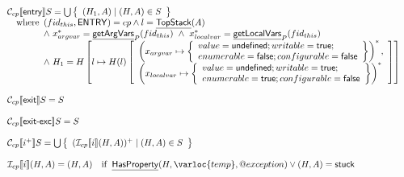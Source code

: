 \[
\begin{array}{l} 
\N _{cp}\lbr {\sf entry} \rbr S = 
 \bigcup\set{(H_1,A) \mid (H,A)\in S} \\
 \quad\wherec{
   ({fid_{this}},\SF{ENTRY}) = cp \land l=\chf{TopStack}(A)\\
   \land\ x_{argvar}^{*} = \chf{getArgVars}_P({fid_{this}})\ 
   \land\ x_{localvar}^{*} = \chf{getLocalVars}_P({fid_{this}}) \\
   \land\ H_1=H\left[l\mapsto
   H(l)
     \left[
       \begin{array}{l}
         \left(x_{argvar}\mapsto\set{value=\SF{undefined};writable=\vtrue;\\
             enumerable=\vfalse;configurable=\vfalse}\right)^{*}, \\
         \left(x_{localvar}\mapsto\set{value=\SF{undefined};writable=\vtrue;\\
             enumerable=\vtrue;configurable=\vfalse}\right)^{*} \\
    \end{array}
     \right]
     \right] \\
}\\\\

\N _{cp}\lbr \SF{exit} \rbr S = S \\\\
\N _{cp}\lbr \SF{exit-exc} \rbr S = S \\\\

\N _{cp}\lbr i^+\rbr S = \bigcup\set{(\I _{cp} \lbr i\rbr(H,A))^{+} \mid (H,A)\in S}\\\\

\I _{cp}\lbr i \rbr (H,A) = (H,A)
\quad\ifc{\chf{HasProperty}(H,\varloc{temp},\varprop{exception}) \lor (H,A)=\SF{stuck}}
\\\\


\end{array}\]
